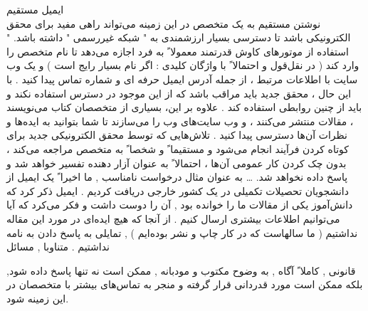 \documentclass[xcolor=dvipsnames, professionalfont]{beamer}
\begin{document}
\begin{frame}
ایمیل مستقیم\\
نوشتن مستقیم به یک متخصص در این زمینه می‌تواند راهی مفید برای محقق الکترونیکی باشد تا دسترسی بسیار ارزشمندی به " شبکه غیررسمی " داشته باشد. " استفاده از موتورهای کاوش قدرتمند معمولا ً به فرد اجازه می‌دهد تا نام متخصص را وارد کند ( در نقل‌قول و احتمالا ً با واژگان کلیدی : اگر نام بسیار رایج است ) و یک وب سایت با اطلاعات مرتبط ، از جمله آدرس ایمیل حرفه ای و شماره تماس پیدا کنید . با این حال ، محقق جدید باید مراقب باشد که از این موجود در دسترس استفاده نکند و باید از چنین روابطی استفاده کند . علاوه بر این، بسیاری از متخصصان کتاب می‌نویسند ، مقالات منتشر می‌کنند ، و وب سایت‌های وب را می‌سازند تا شما بتوانید به ایده‌ها و نظرات آن‌ها دسترسی پیدا کنید . تلاش‌هایی که توسط محقق الکترونیکی جدید برای کوتاه کردن فرآیند انجام می‌شود و مستقیما ً و شخصا ً به متخصص مراجعه می‌کند ، بدون چک کردن کار عمومی آن‌ها ، احتمالا ً به عنوان آزار دهنده تفسیر خواهد شد و پاسخ داده نخواهد شد. … 
به عنوان مثال درخواست نامناسب , ما اخیرا ً یک ایمیل از دانشجویان تحصیلات تکمیلی در یک کشور خارجی دریافت کردیم . ایمیل ذکر کرد که دانش‌آموز یکی از مقالات ما را خوانده بود , آن را دوست داشت و فکر می‌کرد که آیا می‌توانیم اطلاعات بیشتری ارسال کنیم . از آنجا که هیچ ایده‌ای در مورد این مقاله نداشتیم ( ما سالهاست که در کار چاپ و نشر بوده‌ایم ) , تمایلی به پاسخ دادن به نامه نداشتیم . متناوبا , مسائل 






\end{frame}
\begin{frame}
	قانونی , کاملا ً آگاه , به وضوح مکتوب و مودبانه , ممکن است نه تنها پاسخ داده شود, بلکه ممکن است مورد قدردانی قرار گرفته و منجر به تماس‌های بیشتر با متخصصان در این زمینه شود.
\end{frame}
\end{document}

